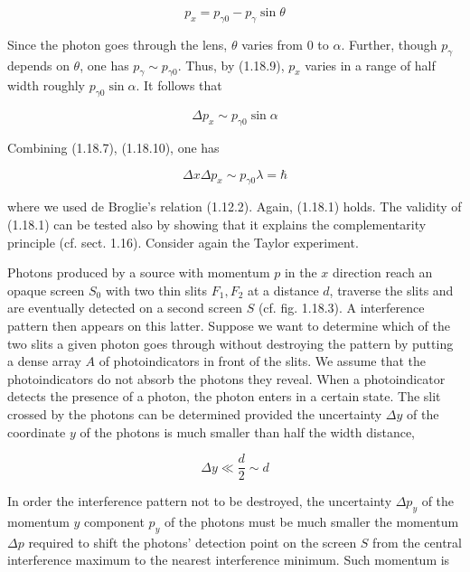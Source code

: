 \documentclass{article}
\begin{document}
\begin{equation*}
p_{x}=p_{\gamma 0}-p_{\gamma} \sin \theta \tag{1.18.9}
\end{equation*}
 

Since the photon goes through the lens, $\theta$ varies from 0 to $\alpha$. Further, though $p_{\gamma}$ depends on $\theta$, one has $p_{\gamma} \sim p_{\gamma 0}$. Thus, by (1.18.9), $p_{x}$ varies in a range of half width roughly $p_{\gamma 0} \sin \alpha$. It follows that
 
\begin{equation*}
\Delta p_{x} \sim p_{\gamma 0} \sin \alpha \tag{1.18.10}
\end{equation*}
 

Combining (1.18.7), (1.18.10), one has
 
\begin{equation*}
\Delta x \Delta p_{x} \sim p_{\gamma 0} \lambda=\hbar \tag{1.18.11}
\end{equation*}
 
where we used de Broglie's relation (1.12.2). Again, (1.18.1) holds.
The validity of (1.18.1) can be tested also by showing that it explains the complementarity principle (cf. sect. 1.16). Consider again the Taylor experiment.

Photons produced by a source with momentum $p$ in the $x$ direction reach an opaque screen $S_{0}$ with two thin slits $F_{1}, F_{2}$ at a distance $d$, traverse the slits and are eventually detected on a second screen $S$ (cf. fig. 1.18.3). A interference pattern then appears on this latter. Suppose we want to determine which of the two slits a given photon goes through without destroying the pattern by putting a dense array $A$ of photoindicators in front of the slits. We assume that the photoindicators do not absorb the photons they reveal. When a photoindicator detects the presence of a photon, the photon enters in a certain state. The slit crossed by the photons can be determined provided the uncertainty $\Delta y$ of the coordinate $y$ of the photons is much smaller than half the width distance,
 
\begin{equation*}
\Delta y \ll \frac{d}{2} \sim d \tag{1.18.12}
\end{equation*}
 

In order the interference pattern not to be destroyed, the uncertainty $\Delta p_{y}$ of the momentum $y$ component $p_{y}$ of the photons must be much smaller the momentum $\Delta p$ required to shift the photons' detection point on the screen $S$ from the central interference maximum to the nearest interference minimum. Such momentum is
\end{document}
